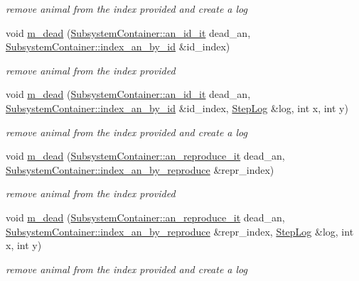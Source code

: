 \begin{DoxyCompactItemize}
\begin{DoxyCompactList}\small\item\em remove animal from the index provided and create a log \end{DoxyCompactList}\item 
void \hyperlink{classEcosystemContainer_ac20491928d3df161e621586a282b8e04}{m\_\-dead} (\hyperlink{classSubsystemContainer_a016775688f9d4baed66e8bdc3fbc0ec9}{SubsystemContainer::an\_\-id\_\-it} dead\_\-an, \hyperlink{classSubsystemContainer_ae095d19ad8aee4e1f1620166f440cf99}{SubsystemContainer::index\_\-an\_\-by\_\-id} \&id\_\-index)
\begin{DoxyCompactList}\small\item\em remove animal from the index provided \end{DoxyCompactList}\item 
void \hyperlink{classEcosystemContainer_a308e43a136e8990d4229dbdd6a8bfa56}{m\_\-dead} (\hyperlink{classSubsystemContainer_a016775688f9d4baed66e8bdc3fbc0ec9}{SubsystemContainer::an\_\-id\_\-it} dead\_\-an, \hyperlink{classSubsystemContainer_ae095d19ad8aee4e1f1620166f440cf99}{SubsystemContainer::index\_\-an\_\-by\_\-id} \&id\_\-index, \hyperlink{structStepLog}{StepLog} \&log, int x, int y)
\begin{DoxyCompactList}\small\item\em remove animal from the index provided and create a log \end{DoxyCompactList}\item 
void \hyperlink{classEcosystemContainer_a76a30d59c284f91c5df800631b9acd0a}{m\_\-dead} (\hyperlink{classSubsystemContainer_aee4873426aef4e4f9f8d41ffb2b2f781}{SubsystemContainer::an\_\-reproduce\_\-it} dead\_\-an, \hyperlink{classSubsystemContainer_a08f08e93dceda155601c8ff6ed31839e}{SubsystemContainer::index\_\-an\_\-by\_\-reproduce} \&repr\_\-index)
\begin{DoxyCompactList}\small\item\em remove animal from the index provided \end{DoxyCompactList}\item 
void \hyperlink{classEcosystemContainer_ab9766e2ce58e850fa2764e07027f88db}{m\_\-dead} (\hyperlink{classSubsystemContainer_aee4873426aef4e4f9f8d41ffb2b2f781}{SubsystemContainer::an\_\-reproduce\_\-it} dead\_\-an, \hyperlink{classSubsystemContainer_a08f08e93dceda155601c8ff6ed31839e}{SubsystemContainer::index\_\-an\_\-by\_\-reproduce} \&repr\_\-index, \hyperlink{structStepLog}{StepLog} \&log, int x, int y)
\begin{DoxyCompactList}\small\item\em remove animal from the index provided and create a log \end{DoxyCompactList}\item 

\end{DoxyCompactItemize}
